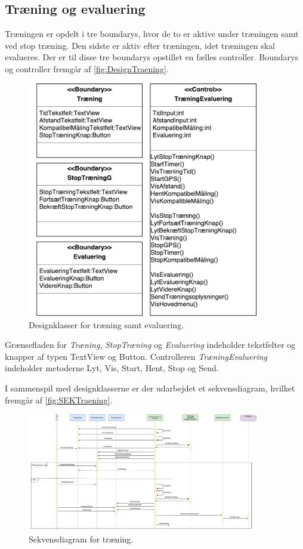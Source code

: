 \subsection*{Træning og evaluering}
Træningen er opdelt i tre boundarys, hvor de to er aktive under træningen samt ved stop træning. Den sidste er aktiv efter træningen, idet træningen skal evalueres. Der er til disse tre boundarys opstillet en fælles controller. Boundarys og controller fremgår af \autoref{fig:DesignTraening}. 

\begin{figure} [H]
\centering
\includegraphics[width=0.9\textwidth]{figures/MVC/MVCTraening}
\caption{Designklasser for træning samt evaluering.}
\label{fig:DesignTraening}
\end{figure}

\noindent
Grænsefladen for \textit{Træning}, \textit{StopTræning} og \textit{Evaluering} indeholder tekstfelter og knapper af typen TextView og Button. Controlleren \textit{TræningEvaluering} indeholder metoderne Lyt, Vis, Start, Hent, Stop og Send. 

I sammenspil med designklasserne er der udarbejdet et sekvensdiagram, hvilket fremgår af \autoref{fig:SEKTraening}. 

\begin{figure} [H]
\centering
\includegraphics[width=0.9\textwidth]{figures/Sek/SEKTraening}
\caption{Sekvensdiagram for træning.}
\label{fig:SEKTraening}
\end{figure}

